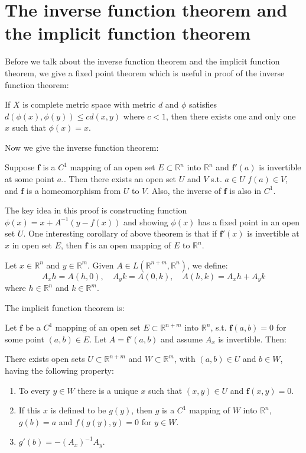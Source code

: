 \section{The inverse function theorem and the implicit function theorem}
Before we talk about the inverse function theorem and the implicit function theorem, we give a fixed point theorem which is useful in proof of the inverse function theorem:
\begin{theorem}
    If $X$ is complete metric space with metric $d$ and $\phi$ satisfies $d(\phi(x),\phi(y))\leq cd(x,y)$ where $c<1$, then there exists one and only one $x$ such that $\phi(x)=x$.
\end{theorem}
Now we give the inverse function theorem:
\begin{theorem}
    Suppose $\mathbf{f}$ is a $C^1$ mapping of an open set $E\subset \mathbb{R}^n$ into $\mathbb{R}^n$ and $\mathbf{f}'(a)$ is invertible at some point $a$.. Then there exists an open set $U$ and $V$ s.t. $a\in U$ $f(a)\in V$, and $\mathbf{f}$ is a homeomorphism from $U$ to $V$. Also, the inverse of $\mathbf{f}$ is also in $C^1$.
\end{theorem}
The key idea in this proof is constructing function $\phi(x)=x+A^{-1}(y-f(x))$ and showing $\phi(x)$ has a fixed point in an open set $U$. One interesting corollary of above theorem is that if $\mathbf{f}'(x)$ is invertible at $x$ in open set $E$, then $\mathbf{f}$ is an open mapping of $E$ to $\mathbb{R}^n$.\par
Let $x\in \mathbb{R}^n$ and $y\in \mathbb{R}^m$. Given $A\in L(\mathbb{R}^{n+m},\mathbb{R}^n)$, we define:
\begin{equation*}
    A_xh=A(h,0),\quad A_yk=A(0,k),\quad A(h,k)=A_xh+A_yk
\end{equation*}
where $h\in \mathbb{R}^n$ and $k\in \mathbb{R}^m$.\par
The implicit function theorem is:
\begin{theorem}
    Let $\mathbf{f}$ be a $C^1$ mapping of an open set $E\subset \mathbb{R}^{n+m}$ into $\mathbb{R}^n$, s.t. $\mathbf{f}(a,b)=0$ for some point $(a,b)\in E$. Let $A=\mathbf{f}'(a,b)$ and assume $A_x$ is invertible. Then:\par
    There exists open sets $U\subset \mathbb{R}^{n+m}$ and $W\subset \mathbb{R}^m$, with $(a,b)\in U$ and $b\in W$, having the following property:
    \begin{enumerate}
        \item To every $y\in W$ there is a unique $x$ such that $(x,y)\in U$ and $\mathbf{f}(x,y)=0$.
        \item If this $x$ is defined to be $g(y)$, then $g$ is a $C^1$ mapping of $W$ into $\mathbb{R}^n$, $g(b)=a$ and $f(g(y),y)=0$ for $y\in W$.
        \item $g'(b)=-(A_x)^{-1}A_y$.
    \end{enumerate}
\end{theorem}
